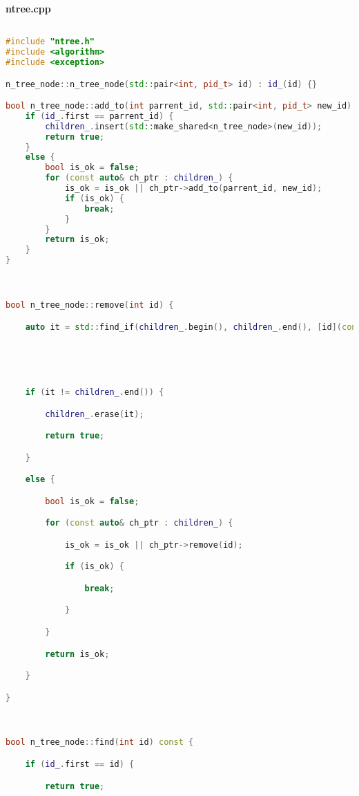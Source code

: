 \textbf{ntree.cpp}

\begin{lstlisting}[language=C++]

#include "ntree.h"
#include <algorithm>
#include <exception>

n_tree_node::n_tree_node(std::pair<int, pid_t> id) : id_(id) {}

bool n_tree_node::add_to(int parrent_id, std::pair<int, pid_t> new_id) {
    if (id_.first == parrent_id) {
        children_.insert(std::make_shared<n_tree_node>(new_id));
        return true;
    } 
    else {
        bool is_ok = false;
        for (const auto& ch_ptr : children_) {
            is_ok = is_ok || ch_ptr->add_to(parrent_id, new_id);
            if (is_ok) {
                break;
            }
        }
        return is_ok;
    }
}



bool n_tree_node::remove(int id) {

    auto it = std::find_if(children_.begin(), children_.end(), [id](const auto& ptr) { 

                                                                                         return ptr->id_.first == id; 

                                                                                     });

    if (it != children_.end()) {

        children_.erase(it);

        return true;

    } 

    else {

        bool is_ok = false;

        for (const auto& ch_ptr : children_) {

            is_ok = is_ok || ch_ptr->remove(id);

            if (is_ok) {

                break;

            }

        }

        return is_ok;

    }

}



bool n_tree_node::find(int id) const {

    if (id_.first == id) {

        return true;


\end{lstlisting}
